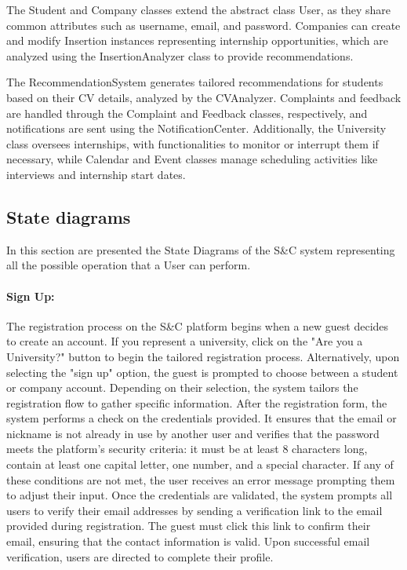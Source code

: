 The Student and Company classes extend the abstract class User, as they share common attributes such as username, email, and password. Companies can create and modify Insertion instances representing internship opportunities, which are analyzed using the InsertionAnalyzer class to provide recommendations.

The RecommendationSystem generates tailored recommendations for students based on their CV details, analyzed by the CVAnalyzer. Complaints and feedback are handled through the Complaint and Feedback classes, respectively, and notifications are sent using the NotificationCenter. Additionally, the University class oversees internships, with functionalities to monitor or interrupt them if necessary, while Calendar and Event classes manage scheduling activities like interviews and internship start dates.


\subsection{State diagrams}
\label{subsec:state_diagrams}%

In this section are presented the State Diagrams of the S\&C system
representing all the possible operation that a User can perform.

\paragraph{Sign Up:} The registration process on the S\&C platform begins
  when a new guest decides to create an account. If you represent a
  university, click on the "Are you a
  University?" button to begin the tailored
  registration process. Alternatively, upon selecting the "sign up"
  option, the guest is prompted to choose between a student or company
  account. Depending on their selection, the system tailors the
  registration flow to gather specific information. After the
  registration form, the system performs a check on the credentials
  provided. It ensures that the email or nickname is not already in use
  by another user and verifies that the password meets the platform's
  security criteria: it must be at least 8 characters long, contain at
  least one capital letter, one number, and a special character. If any
  of these conditions are not met, the user receives an error message
  prompting them to adjust their input. Once the credentials are
  validated, the system prompts all users to verify their email
  addresses by sending a verification link to the email provided during
  registration. The guest must click this link to confirm their email,
  ensuring that the contact information is valid. Upon successful email
  verification, users are directed to complete their profile.

